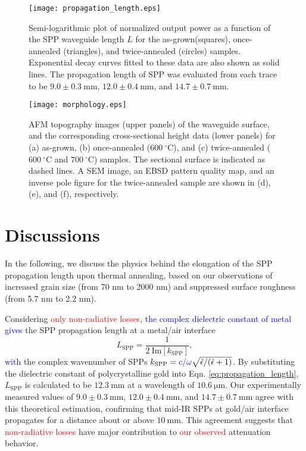 \documentclass[aip,apl,reprint]{revtex4-1}
\begin{document}
 \begin{figure}
    \texttt{[image: propagation\_length.eps]}
    \caption{Semi-logarithmic plot of normalized output power as a function of the SPP waveguide length $L$ for the as-grown(squares), once-annealed (triangles), and twice-annealed (circles) samples. Exponential decay curves fitted to these data are also shown as solid lines. The propagation length of SPP was evaluated from each trace to be $9.0\pm0.3\:\mathrm{mm}$, $12.0\pm0.4\:\mathrm{mm}$, and $14.7\pm0.7\:\mathrm{mm}$.}
       \label{fig:propagation_length}
\end{figure}

  \begin{figure}
    \texttt{[image: morphology.eps]}
        \caption{AFM topography images (upper panels) of the waveguide surface, and the corresponding cross-sectional height data (lower panels) for (a) as-grown, (b) once-annealed ($600\:^\circ\mathrm{C}$), and (c) twice-annealed ($600\:^\circ\mathrm{C}$ and $700\:^\circ\mathrm{C}$) samples. The sectional surface is indicated as dashed lines. A SEM image, an EBSD pattern quality map, and an inverse pole figure for the twice-annealed sample are shown in (d), (e), and (f), respectively.}
    \label{fig:morphology}
\end{figure}

\section{Discussions}
\label{sec:discussion}
In the following, we discuss the physics behind the elongation of the SPP propagation length upon thermal annealing, based on our observations of increased grain size (from 70 nm to 2000 nm) and suppressed surface roughness (from 5.7 nm to 2.2 nm). 

\color{black}
Considering \textcolor{red}{only non-radiative losses}, \textcolor{blue}{the complex dielectric constant of metal gives} the SPP propagation length at a metal/air interface
\begin{equation}
 L_{\mathrm{SPP}} = \frac{1}{2\:\mathrm{Im}[k_{\mathrm{SPP}}]},
\label{eq:propagation_length}
\end{equation}
\textcolor{blue}{with} the complex wavenumber of SPPs \textcolor{red}{$k_{\mathrm{SPP}}=\textcolor{blue}{c/\omega} \sqrt{\tilde{\epsilon}/(\tilde{\epsilon}+1)}$}. By substituting the dielectric constant of polycrystalline gold\cite{Palik} into Eqn. \ref{eq:propagation_length}, $L_{\mathrm{SPP}}$ is calculated to be $12.3\:\mathrm{mm}$ at a wavelength of $10.6\:\mathrm{\mu m}$.
Our experimentally measured values of $9.0\pm0.3\:\mathrm{mm}$, $12.0\pm0.4\:\mathrm{mm}$, and $14.7\pm0.7\:\mathrm{mm}$ agree with this theoretical estimation, confirming that mid-IR SPPs at gold/air interface propagates for a distance about or above $10\:\mathrm{mm}$. This agreement suggests that \textcolor{red}{non-radiative losses} have major contribution to \textcolor{red}{our observed} attenuation behavior.
\end{document}
